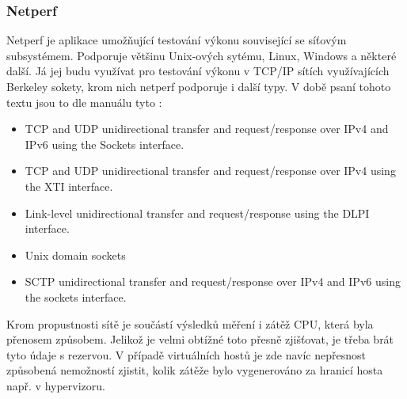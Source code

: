 \subsubsection{Netperf}
Netperf je aplikace umožňující testování výkonu související se síťovým subsystémem. Podporuje většinu Unix-ových sytému, Linux, Windows a některé další. Já jej budu využívat pro testování výkonu v TCP/IP sítích využívajících Berkeley sokety, krom nich netperf podporuje i další typy. V době psaní tohoto textu jsou to dle manuálu tyto \cite{io:netperf}:
\begin{itemize}
  \item TCP and UDP unidirectional transfer and request/response over IPv4 and IPv6 using the Sockets interface. 
  \item TCP and UDP unidirectional transfer and request/response over IPv4 using the XTI interface. 
  \item Link-level unidirectional transfer and request/response using the DLPI interface. 
  \item Unix domain sockets 
  \item SCTP unidirectional transfer and request/response over IPv4 and IPv6 using the sockets interface.
\end{itemize}
Krom propustnosti sítě je součástí výsledků měření i zátěž CPU, která byla přenosem způsobem. Jelikož je velmi obtížné toto přesně zjišťovat, je třeba brát tyto údaje s rezervou. V případě virtuálních hostů je zde navíc nepřesnost způsobená nemožností zjistit, kolik zátěže bylo vygenerováno za hranicí hosta např. v hypervizoru.
